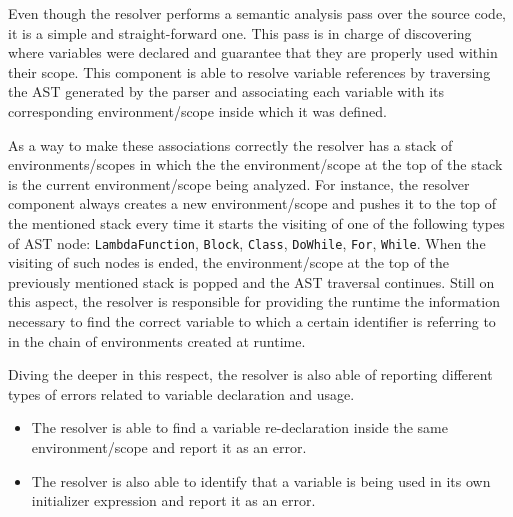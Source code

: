 Even though the resolver performs a semantic analysis pass over the source code, it is a simple and straight-forward one. This pass is in charge of discovering where variables were declared and guarantee that they are properly used within their scope. This component is able to resolve variable references by traversing the AST generated by the parser and associating each variable with its corresponding environment/scope inside which it was defined.

As a way to make these associations correctly the resolver has a stack of environments/scopes in which the the environment/scope at the top of the stack is the current environment/scope being analyzed. For instance, the resolver component always creates a new environment/scope and pushes it to the top of the mentioned stack every time it starts the visiting of one of the following types of AST node: \texttt{LambdaFunction}, \texttt{Block}, \texttt{Class}, \texttt{DoWhile}, \texttt{For}, \texttt{While}. When the visiting of such nodes is ended, the environment/scope at the top of the previously mentioned stack is popped and the AST traversal continues. Still on this aspect, the resolver is responsible for providing the runtime the information necessary to find the correct variable to which a certain identifier is referring to in the chain of environments created at runtime.

Diving the deeper in this respect, the resolver is also able of reporting different types of errors related to variable declaration and usage.
\begin{itemize}
    \item The resolver is able to find a variable re-declaration inside the same environment/scope and report it as an error.
    \item The resolver is also able to identify that a variable is being used in its own initializer expression and report it as an error.   
\end{itemize}

